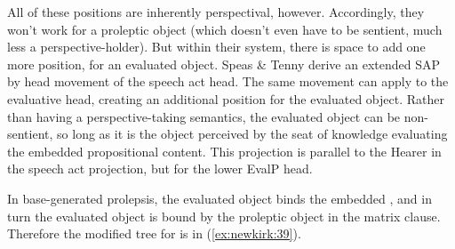 \documentclass[output=paper,colorlinks,citecolor=brown]{langscibook}
\begin{document}
\ea%
    \label{ex:newkirk:38}
\z


All of these positions are inherently perspectival, however. Accordingly, they won't work for a proleptic object (which doesn't even have to be sentient, much less a perspective-holder). But within their system, there is space to add one more position, for an \alert{evaluated object}. Speas \& Tenny derive an extended SAP by head movement of the speech act head. The same movement can apply to the evaluative head, creating an additional position for the evaluated object. Rather than having a perspective-taking semantics, the evaluated object can be non-sentient, so long as it is the object perceived by the seat of knowledge evaluating the embedded propositional content. This projection is parallel to the Hearer in the speech act projection, but for the lower EvalP head.


In base-generated prolepsis, the evaluated object binds the embedded \agre, and in turn the evaluated object is bound by the proleptic object in the matrix clause. Therefore the modified tree for  is in (\ref{ex:newkirk:39}).

\begin{exe}
\end{exe}
\end{document}
